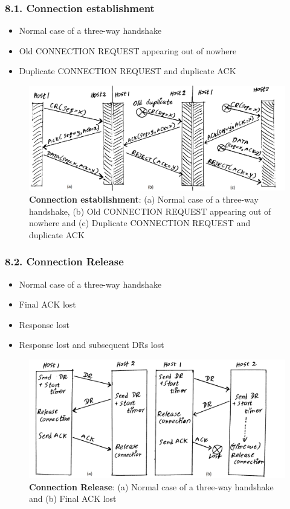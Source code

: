 \documentclass[a4paper,11pt]{article}
\begin{document}
\subsubsection*{8.1. Connection establishment}

\begin{itemize}
\item Normal case of a three-way handshake
\item Old CONNECTION REQUEST appearing out of nowhere
\item Duplicate CONNECTION REQUEST  and duplicate ACK
\end{itemize}

\begin{figure}[H]
	\centering
	\includegraphics[scale=0.14]{figures/img100}
	\caption{\textbf{Connection establishment}: (a) Normal case of a three-way handshake, (b) Old CONNECTION REQUEST appearing out of nowhere and (c) Duplicate CONNECTION REQUEST  and duplicate ACK}
\end{figure}

\subsubsection*{8.2. Connection Release}

\begin{itemize}
\item Normal case of a three-way handshake
\item Final ACK lost
\item Response lost
\item Response lost and subsequent DRs lost
\end{itemize}

\begin{figure}[H]
	\centering
	\includegraphics[scale=0.14]{figures/img101}
	\caption{\textbf{Connection Release}: (a) Normal case of a three-way handshake and (b) Final ACK lost}
\end{figure}
\end{document}
